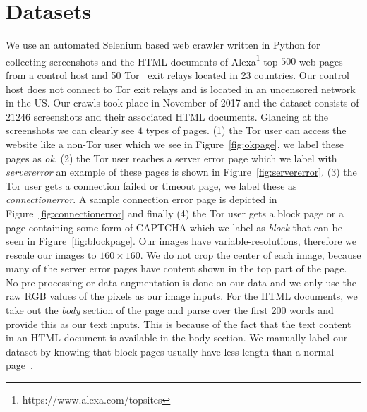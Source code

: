 \documentclass{article} %
\begin{document}
\section{Datasets} 
\label{datasets}
We use an automated Selenium based web crawler written in Python for collecting screenshots and the HTML documents of Alexa\footnote{https://www.alexa.com/topsites} top $500$ web pages from a control host and 50 Tor~\cite{tor} exit relays located in 23 countries. Our control host does not connect to Tor exit relays and is located in an uncensored network in the US. Our crawls took place in November of 2017 and the dataset consists of $21246$ screenshots and their associated HTML documents. Glancing at the screenshots we can clearly see $4$ types of pages. (1) the Tor user can access the website like a non-Tor user which we see in Figure~\ref{fig:okpage}, we label these pages as \textit{ok}. (2) the Tor user reaches a server error page which we label with \textit{servererror} an example of these pages is shown in Figure~\ref{fig:servererror}. (3) the Tor user gets a connection failed or timeout page, we label these as \textit{connectionerror}. A sample connection error page is depicted in Figure~\ref{fig:connectionerror} and finally (4) the Tor user gets a block page or a page containing some form of CAPTCHA which we label as \textit{block} that can be seen in Figure~\ref{fig:blockpage}.
Our images have variable-resolutions, therefore we rescale our images to $160\times160$. We do not crop the center of each image, because many of the server error pages have content shown in the top part of the page. No pre-processing or data augmentation is done on our data and we only use the raw RGB values of the pixels as our image inputs. For the HTML documents, we take out the \textit{body} section of the page and parse over the first 200 words and provide this as our text inputs. This is because of the fact that the text content in an HTML document is available in the body section. We manually label our dataset by knowing that block pages usually have less length than a normal page~\cite{imc14_phillipa}.
\end{document}
